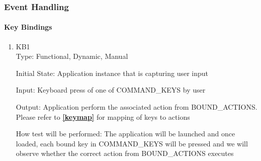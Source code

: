 \documentclass[12pt, titlepage]{article}
\begin{document}
	\subsubsection{Event Handling}
	
	\paragraph{Key Bindings}
	\begin{enumerate}
		\item{KB1\\}
		Type: Functional, Dynamic, Manual
		
		Initial State: Application instance that is capturing user input
		
		Input: Keyboard press of one of COMMAND\_KEYS by user
		
		Output: Application perform the associated action from BOUND\_ACTIONS. 
		Please refer to \textbf{\autoref{keymap}}  for mapping of keys
		to actions
		
		How test will be performed: The application will be launched and once loaded,
		each bound key in COMMAND\_KEYS will be pressed and we will observe whether
		the correct action from BOUND\_ACTIONS executes
		
	\end{enumerate}
\end{document}
